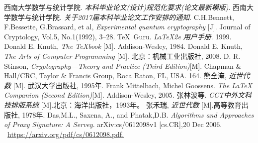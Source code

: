 \renewcommand{\baselinestretch}{\yuanbeishu} %
\normalsize{}                         %
\begin{thebibliography}{9}                   %
    西南大学数学与统计学院.
    \textsl{本科毕业论文(设计)规范化要求(论文最新模版)}.
    西南大学数学与统计学院.
    \textsl{关于2017届本科毕业论文工作安排的通知}.
    C.H.Bennett, F.Bessette, G.Brassard, et al,
    \textsl{Experimental quantum cryptography} [J].
    Journal of Cryptology, Vol.5, No.1(1992), 3--28.
    \TeX\, Guru.
    \textsl{\LaTeX 2e 用户手册}. 1999.
    Donald E. Knuth,
    \textsl{The \TeX book} [M]. Addison-Wesley, 1984.
    Donald E. Knuth,
    \textsl{The Arts of Computer Programming} [M]. 北京：机械工业出版社, 2008.
    D. R. Stinson,
    \textsl{Cryptography---Theory and Practice (Third Edition)}[M]. Chapman \& Hall/CRC, Taylor \& Francis Group, Roca Raton, FL, USA. 164.
    熊全淹,
    \textsl{近世代数} [M]. 武汉大学出版社, 1995年.
    Frank Mittelbach, Michel Goossens.
    \textsl{The \LaTeX \,Companion (Second Edition)}[M]. Addison-Wesley, 2005.
    张林波等.
    \textsl{CCT中外文科技排版系统} [M].北京：海洋出版社，1993年。
    张禾瑞,
    \textsl{近世代数} [M].高等教育出版社, 1978年.
    Das,M.L., Saxena, A., and Phatak,D.B.
    \emph{Algorithms and Approaches of Proxy Signature: A Servey}. arXiv:cs/0612098v1 [cs.CR],20 Dec 2006. ~\href{https://arxiv.org/pdf/cs/0612098.pdf}{https://arxiv.org/pdf/cs/0612098.pdf.}

\end{thebibliography}
